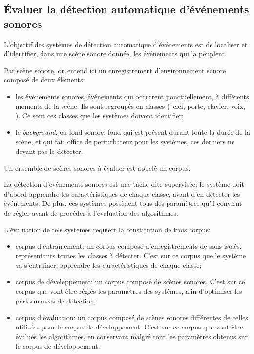 \subsection{Évaluer la détection automatique d'événements sonores}

L'objectif des systèmes de détection automatique d'événements est de localiser et d'identifier, dans une scène sonore donnée, les événements qui la peuplent.

Par scène sonore, on entend ici un enregistrement d'environnement sonore composé de deux éléments:

\begin{itemize}
\item les événements sonores, événements qui occurrent ponctuellement, à différents moments de la scène. Ils sont regroupés en classes (\eg~clef, porte, clavier, voix, \etc). Ce sont ces classes que les systèmes doivent identifier;
\item le \emph{background}, ou fond sonore, fond qui est présent durant toute la durée de la scène, et qui fait office de perturbateur pour les systèmes, ces derniers ne devant pas le détecter.
\end{itemize}

Un ensemble de scènes sonores à évaluer est appelé un corpus.

La détection d'événements sonores est une tâche dite supervisée: le système doit d'abord apprendre les caractéristiques de chaque classe, avant d'en détecter les événements. De plus, ces systèmes possèdent tous des paramètres qu'il convient de régler avant de procéder à l'évaluation des algorithmes.

L'évaluation de tels systèmes requiert la constitution de trois corpus:

\begin{itemize}
\item corpus d'entraînement: un corpus composé d'enregistrements de sons isolés, représentants toutes les classes à détecter. C'est sur ce corpus que le système va s'entraîner, apprendre les caractéristiques de chaque classe;
\item corpus de développement: un corpus composé de scènes sonores. C'est sur ce corpus que vont être réglés les paramètres des systèmes, afin d'optimiser les performances de détection;
\item corpus d'évaluation: un corpus composé de scènes sonores différentes de celles utilisées pour le corpus de développement. C'est sur ce corpus que vont être évalués les algorithmes, en conservant malgré tout les paramètres obtenus sur le corpus de développement.
\end{itemize}

